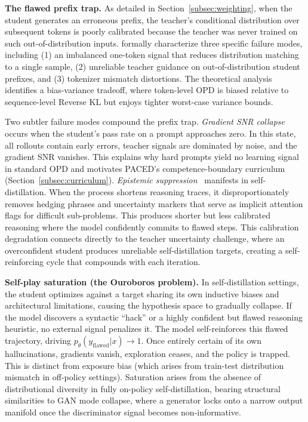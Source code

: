 \documentclass{article} %
\newcommand{\ptheta}{p_\theta}
\begin{document}
\textbf{The flawed prefix trap.} As detailed in Section~\ref{subsec:weighting}, when the student generates an erroneous prefix, the teacher's conditional distribution over subsequent tokens is poorly calibrated because the teacher was never trained on such out-of-distribution inputs. \citet{2603.25562} formally characterize three specific failure modes, including (1) an imbalanced one-token signal that reduces distribution matching to a single sample, (2) unreliable teacher guidance on out-of-distribution student prefixes, and (3) tokenizer mismatch distortions. The theoretical analysis identifies a bias-variance tradeoff, where token-level OPD is biased relative to sequence-level Reverse KL but enjoys tighter worst-case variance bounds.

Two subtler failure modes compound the prefix trap. \emph{Gradient SNR collapse} occurs when the student's pass rate on a prompt approaches zero. In this state, all rollouts contain early errors, teacher signals are dominated by noise, and the gradient SNR vanishes. This explains why hard prompts yield no learning signal in standard OPD and motivates PACED's competence-boundary curriculum (Section~\ref{subsec:curriculum}). \emph{Epistemic suppression}~\citep{2603.24472} manifests in self-distillation. When the process shortens reasoning traces, it disproportionately removes hedging phrases and uncertainty markers that serve as implicit attention flags for difficult sub-problems. This produces shorter but less calibrated reasoning where the model confidently commits to flawed steps. This calibration degradation connects directly to the teacher uncertainty challenge, where an overconfident student produces unreliable self-distillation targets, creating a self-reinforcing cycle that compounds with each iteration.

\textbf{Self-play saturation (the Ouroboros problem).} In self-distillation settings, the student optimizes against a target sharing its own inductive biases and architectural limitations, causing the hypothesis space to gradually collapse. If the model discovers a syntactic ``hack'' or a highly confident but flawed reasoning heuristic, no external signal penalizes it. The model self-reinforces this flawed trajectory, driving $\ptheta(y_{\text{flawed}}|x) \to 1$. Once entirely certain of its own hallucinations, gradients vanish, exploration ceases, and the policy is trapped. This is distinct from exposure bias (which arises from train-test distribution mismatch in off-policy settings). Saturation arises from the absence of distributional diversity in fully on-policy self-distillation, bearing structural similarities to GAN mode collapse, where a generator locks onto a narrow output manifold once the discriminator signal becomes non-informative.
\end{document}

